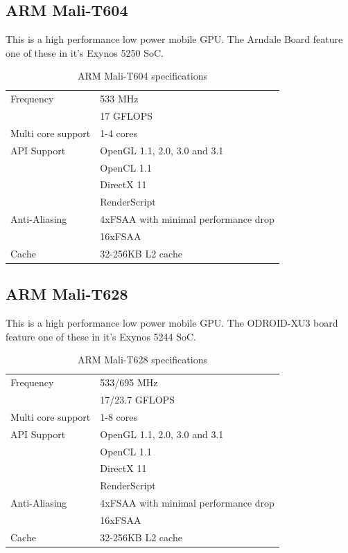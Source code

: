 \subsection{ARM Mali-T604}
This is a high performance low power mobile GPU.
The Arndale Board feature one of these in it's Exynos 5250 SoC.
\begin{table}[H]
  \begin{tabular}{ll}
    \toprule
    Frequency         & 533 MHz\\
                      & 17 GFLOPS  \\
    \midrule
    Multi core support & 1-4 cores  \\
    \midrule
    API Support       & OpenGL 1.1, 2.0, 3.0 and 3.1  \\
                      & OpenCL 1.1  \\
                      & DirectX 11  \\
                      & RenderScript \\
    \midrule
    Anti-Aliasing     & 4xFSAA with minimal performance drop  \\
                      & 16xFSAA  \\
    \midrule
    Cache             & 32-256KB L2 cache \\
    \bottomrule
  \end{tabular}
  \caption{ARM Mali-T604 specifications\label{overflow}}
\end{table}

\subsection{ARM Mali-T628}
This is a high performance low power mobile GPU.
The ODROID-XU3 board feature one of these in it's Exynos 5244 SoC.
\begin{table}[H]
  \begin{tabular}{ll}
    \toprule
    Frequency         & 533/695 MHz \\
                      & 17/23.7 GFLOPS \\
    \midrule
    Multi core support & 1-8 cores  \\
    \midrule
    API Support       & OpenGL 1.1, 2.0, 3.0 and 3.1  \\
                      & OpenCL 1.1  \\
                      & DirectX 11  \\
                      & RenderScript \\
    \midrule
    Anti-Aliasing     & 4xFSAA with minimal performance drop  \\
                      & 16xFSAA  \\
    \midrule
    Cache             & 32-256KB L2 cache \\
    \bottomrule
  \end{tabular}
  \caption{ARM Mali-T628 specifications\label{overflow}}
\end{table}

